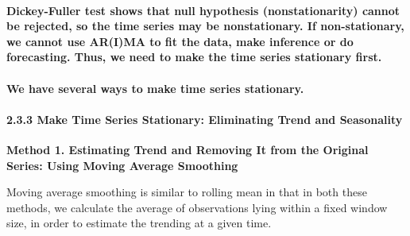 \documentclass[11pt]{article}
\begin{document}
    \paragraph{Dickey-Fuller test shows that null hypothesis
(nonstationarity) cannot be rejected, so the time series may be
nonstationary. If non-stationary, we cannot use AR(I)MA to fit the data,
make inference or do forecasting. Thus, we need to make the time series
stationary
first.}\label{dickey-fuller-test-shows-that-null-hypothesis-nonstationarity-cannot-be-rejected-so-the-time-series-may-be-nonstationary.-if-non-stationary-we-cannot-use-arima-to-fit-the-data-make-inference-or-do-forecasting.-thus-we-need-to-make-the-time-series-stationary-first.}

\paragraph{We have several ways to make time series
stationary.}\label{we-have-several-ways-to-make-time-series-stationary.}

    \paragraph{2.3.3 Make Time Series Stationary: Eliminating Trend and
Seasonality}\label{make-time-series-stationary-eliminating-trend-and-seasonality}

\textbf{Method 1. Estimating Trend and Removing It from the Original
Series: Using Moving Average Smoothing}

Moving average smoothing is similar to rolling mean in that in both
these methods, we calculate the average of observations lying within a
fixed window size, in order to estimate the trending at a given time.
\end{document}

